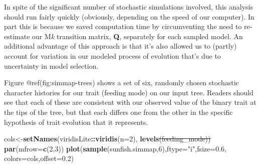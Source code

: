 \documentclass[fleqn,10pt,lineno]{wlpeerj}
\newenvironment{Shaded}{\begin{snugshade}}{\end{snugshade}}
\newcommand{\AttributeTok}[1]{\textcolor[rgb]{0.13,0.29,0.53}{#1}}
\newcommand{\DecValTok}[1]{\textcolor[rgb]{0.00,0.00,0.81}{#1}}
\newcommand{\FloatTok}[1]{\textcolor[rgb]{0.00,0.00,0.81}{#1}}
\newcommand{\FunctionTok}[1]{\textcolor[rgb]{0.13,0.29,0.53}{\textbf{#1}}}
\newcommand{\NormalTok}[1]{#1}
\newcommand{\OtherTok}[1]{\textcolor[rgb]{0.56,0.35,0.01}{#1}}
\newcommand{\SpecialCharTok}[1]{\textcolor[rgb]{0.81,0.36,0.00}{\textbf{#1}}}
\newcommand{\StringTok}[1]{\textcolor[rgb]{0.31,0.60,0.02}{#1}}
\providecommand{\DIFaddtex}[1]{{\protect\color{blue}\uwave{#1}}} %
\providecommand{\DIFdeltex}[1]{{\protect\color{red}\sout{#1}}}                      %
\providecommand{\DIFaddbegin}{} %
\providecommand{\DIFaddend}{} %
\providecommand{\DIFdelbegin}{} %
\providecommand{\DIFdelend}{} %
\providecommand{\DIFadd}[1]{\texorpdfstring{\DIFaddtex{#1}}{#1}} %
\providecommand{\DIFdel}[1]{\texorpdfstring{\DIFdeltex{#1}}{}} %
\newcommand{\DIFscaledelfig}{0.5}
\newlength{\DIFdelgraphicswidth} %
\newlength{\DIFdelgraphicsheight} %
\newcommand{\DIFaddincludegraphics}[2][]{{\color{blue}\fbox{\DIFOincludegraphics[#1]{#2}}}} %
\newcommand{\DIFdelincludegraphics}[2][]{%
\sbox{\DIFdelgraphicsbox}{\DIFOincludegraphics[#1]{#2}}%
\settoboxwidth{\DIFdelgraphicswidth}{\DIFdelgraphicsbox} %
\settoboxtotalheight{\DIFdelgraphicsheight}{\DIFdelgraphicsbox} %
\scalebox{\DIFscaledelfig}{%
\parbox[b]{\DIFdelgraphicswidth}{\usebox{\DIFdelgraphicsbox}\\[-\baselineskip] \rule{\DIFdelgraphicswidth}{0em}}\llap{\resizebox{\DIFdelgraphicswidth}{\DIFdelgraphicsheight}{%
\setlength{\unitlength}{\DIFdelgraphicswidth}%
\begin{picture}(1,1)%
\thicklines\linethickness{2pt} %
{\color[rgb]{1,0,0}\put(0,0){\framebox(1,1){}}}%
{\color[rgb]{1,0,0}\put(0,0){\line( 1,1){1}}}%
{\color[rgb]{1,0,0}\put(0,1){\line(1,-1){1}}}%
\end{picture}%
}\hspace*{3pt}}} %
} %
\DeclareRobustCommand{\DIFaddbegin}{\DIFOaddbegin \let\includegraphics\DIFaddincludegraphics} %
\DeclareRobustCommand{\DIFaddend}{\DIFOaddend \let\includegraphics\DIFOincludegraphics} %
\DeclareRobustCommand{\DIFdelbegin}{\DIFOdelbegin \let\includegraphics\DIFdelincludegraphics} %
\DeclareRobustCommand{\DIFdelend}{\DIFOaddend \let\includegraphics\DIFOincludegraphics} %
\begin{document}
\DIFdelend In spite of the significant number of stochastic simulations involved,
this analysis should run fairly quickly (obviously, depending on the
speed of our computer). In part this is because we saved computation
time by circumventing the need to re-estimate our M\emph{k} transition
matrix, \textbf{Q}, separately for each sampled model. An additional
advantage of this approach is that it's also allowed us to (partly)
account for variation in our modeled process of evolution that's due to
uncertainty in model selection.

Figure @ref(fig:simmap-trees) shows a set of six, randomly chosen
stochastic character histories for our trait (feeding mode) on our input
tree. Readers should see that each of these are consistent with our
observed value of the binary trait at the tips of the tree, but that
each differs one from the other in the specific hypothesis of trait
evolution that it represents.

\begin{Shaded}
\begin{Highlighting}[]
\NormalTok{cols}\OtherTok{\textless{}{-}}\FunctionTok{setNames}\NormalTok{(viridisLite}\SpecialCharTok{::}\FunctionTok{viridis}\NormalTok{(}\AttributeTok{n=}\DecValTok{2}\NormalTok{),}
  \FunctionTok{levels}\DIFdelbegin \DIFdel{\NormalTok{(feeding\_mode))}
}\DIFdelend \DIFaddbegin \DIFadd{\NormalTok{(sunfish.feed\_mode))}
}\DIFaddend \FunctionTok{par}\NormalTok{(}\AttributeTok{mfrow=}\FunctionTok{c}\NormalTok{(}\DecValTok{2}\NormalTok{,}\DecValTok{3}\NormalTok{))}
\FunctionTok{plot}\NormalTok{(}\FunctionTok{sample}\NormalTok{(sunfish.simmap,}\DecValTok{6}\NormalTok{),}\AttributeTok{ftype=}\StringTok{"i"}\NormalTok{,}\AttributeTok{fsize=}\FloatTok{0.6}\NormalTok{,}
  \AttributeTok{colors=}\NormalTok{cols,}\AttributeTok{offset=}\FloatTok{0.2}\NormalTok{)}
\end{Highlighting}
\end{Shaded}
\end{document}
